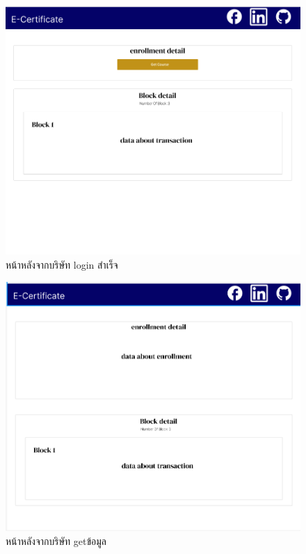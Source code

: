 \graphicspath{ {./images/} }
\begin{figure}[htbp]
  \centering 
  \includegraphics[scale=0.5]{company.png}
  \caption[หน้าหลังจากบริษัท login สำเร็จ]{หน้าหลังจากบริษัท login สำเร็จ}
  \label{fig:company}
\end{figure}

\graphicspath{ {./images/} }
\begin{figure}[htbp]
  \centering 
  \includegraphics[scale=0.5]{comda.png}
  \caption[หน้าหลังจากบริษัท getข้อมูล]{หน้าหลังจากบริษัท getข้อมูล}
  \label{fig:getdata}
\end{figure}


